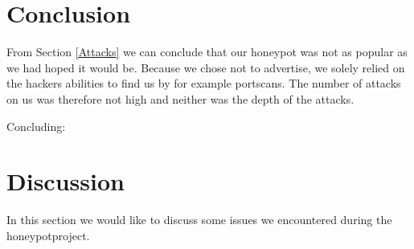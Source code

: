 \documentclass[11pt]{article}
\begin{document}
\section{Conclusion}
\label{Conclusion}
From Section \ref{Attacks} we can conclude that our honeypot was not as popular as we had hoped it would be. Because we chose not to advertise, we solely relied on the hackers abilities to find us by for example portscans. The number of attacks on us was therefore not high and neither was the depth of the attacks. 

Concluding: 


\section{Discussion}
\label{Discussion}
In this section we would like to discuss some issues we encountered during the honeypotproject. 
\end{document}
